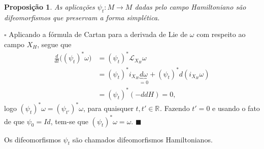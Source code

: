 \documentclass[12pt]{book}
\newtheorem{proposicao}[teorema]{Proposição}
\newenvironment{prova}[1]{$\square$ #1}{\hfill$\blacksquare$}
\newcommand{\bigparenteses}[1]{\Big( #1 \Big) }
\newcommand{\campohamiltonianoabrev}{X_{H}}
\newcommand{\liederivada}[1]{\mathcal{L}_{#1}}
\newcommand{\real}[1]{\mathbb{R}^{#1}}
\begin{document}
	\begin{proposicao}\label{proposicao_familia_simplectomorfismos}
		As aplicações $\psi_{t}:M\to M$ dadas pelo campo Hamiltoniano são difeomorfismos que preservam a forma simplética.
	\end{proposicao}
	\begin{prova}
		Aplicando a fórmula de Cartan para a derivada de Lie de $\omega$ com respeito ao campo $\campohamiltonianoabrev$, segue que		
		$$
		\begin{aligned}
		\frac{d}{dt}\bigparenteses{(\psi_{t})^{*}\omega} 
		&= (\psi_{t})^{*} \liederivada{X_{H}}\omega  
		\\
		&= (\psi_{t})^{*} i_{X_{H}}\underbrace{d\omega }_ {=0}+  (\psi_{t})^{*}d(i_{X_{H}}\omega) 
		\\
		&= (\psi_{t})^{*} (-ddH)=0,
		\end{aligned}
		$$
		logo $(\psi_{t})^{*} \omega = (\psi_{t'})^{*} \omega$, para quaisquer $t, t' \in \real{}$. Fazendo $t'=0$ e usando o fato de que $\psi_{0} = Id$, tem-se que  $(\psi_{t})^{*} \omega = \omega$.
	\end{prova}
	
	Os difeomorfismos $\psi_{t}$ são  chamados difeomorfismos Hamiltonianos.
	
\end{document}
